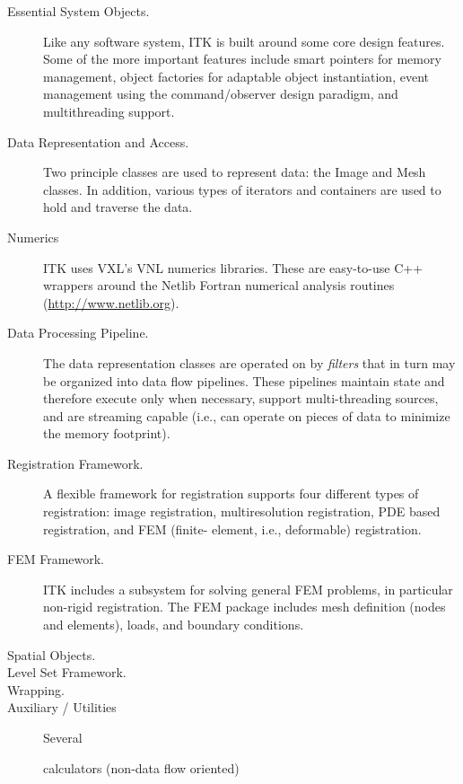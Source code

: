 \begin{description}
	\item[Essential System Objects.] Like any software system, ITK is
        built around some core design features. Some of the more important
        features include smart pointers for memory management, object factories
        for adaptable object instantiation, event management using the 
        command/observer design paradigm, and multithreading support.

	\item[Data Representation and Access.]  Two principle classes are
        used to represent data: the Image and Mesh classes. In addition,
        various types of iterators and containers are used to hold and
        traverse the data.

	\item[Numerics] ITK uses VXL's VNL numerics libraries. These are
        easy-to-use C++ wrappers around the Netlib Fortran numerical 
        analysis routines (\url{http://www.netlib.org}).

	\item[Data Processing Pipeline.]  The data representation classes are
        operated on by \emph{filters} that in turn may be organized into data
        flow pipelines. These pipelines maintain state and therefore execute
        only when necessary, support multi-threading sources, and are streaming
        capable (i.e., can operate on pieces of data to minimize the
        memory footprint).

	\item[Registration Framework.] A flexible framework for registration
        supports four different types of registration: image registration,
        multiresolution registration, PDE based registration, and FEM (finite-
        element, i.e., deformable) registration.

	\item[FEM Framework.] ITK includes a subsystem for solving general
        FEM problems, in particular non-rigid registration. The FEM package
        includes mesh definition (nodes and elements), loads, and boundary
        conditions.

	\item[Spatial Objects.]

	\item[Level Set Framework.]

	\item[Wrapping.]

	\item[Auxiliary / Utilities] Several
        
	calculators (non-data flow oriented)

\end{description}


